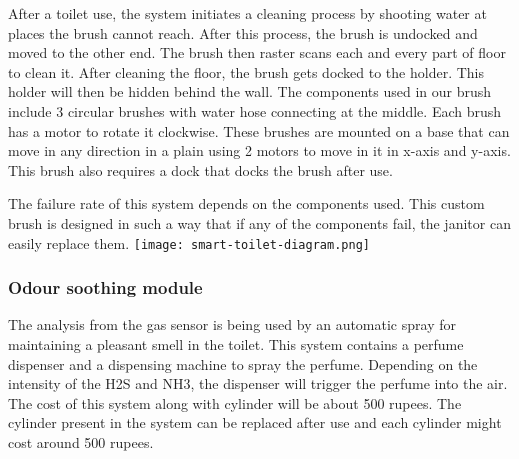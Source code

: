 \documentclass[conference]{IEEEtran}
\begin{document}
                After a toilet use, the system initiates a cleaning process by shooting water at places the brush cannot reach. After this process, the brush is undocked and moved to the other end. The brush then raster scans each and every part of floor to clean it. After cleaning the floor, the brush gets docked to the holder. This holder will then be hidden behind the wall.
                The components used in our brush include 3 circular brushes with water hose connecting at the middle. Each brush has a motor to rotate it clockwise. These brushes are mounted on a base that can move in any direction in a plain using 2 motors to move in it in x-axis and y-axis. This brush also requires a dock that docks the brush after use.

                The failure rate of this system depends on the components used. This custom brush is designed in such a way that if any of the components fail, the janitor can easily replace them.
                \texttt{[image: smart-toilet-diagram.png]}
        
            \subsubsection{Odour soothing module}
                The analysis from the gas sensor is being used by an automatic spray for maintaining a pleasant smell in the toilet. This system contains a perfume dispenser and a dispensing machine to spray the perfume.
                Depending on the intensity of the H2S and NH3, the dispenser will trigger the perfume into the air. The cost of this system along with cylinder will be about 500 rupees. The cylinder present in the system can be replaced after use and each cylinder might cost around 500 rupees.
                
\end{document}
